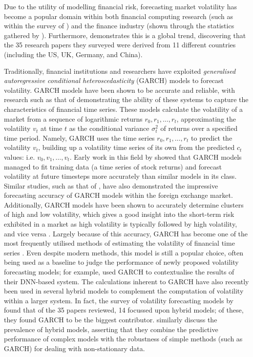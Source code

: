 \documentclass[a4paper, 11pt]{report}
\begin{document}
    Due to the utility of modelling financial risk, forecasting market volatility has become a popular domain within both financial computing research (such as within the survey of \citet{ozbayoglu-2020}) and the finance industry (shown through the statistics gathered by \citet{chartis-2019}). Furthermore, \citet{ge-2022} demonstrates this is a global trend, discovering that the 35 research papers they surveyed were derived from 11 different countries (including the US, UK, Germany, and China).

    Traditionally, financial institutions and researchers have exploited \emph{generalised autoregressive conditional heteroscedasticity} (GARCH) models to forecast volatility. GARCH models have been shown to be accurate and reliable, with research such as that of \citet{lahmiri-2017} demonstrating the ability of these systems to capture the characteristics of financial time series. These models calculate the volatility of a market from a sequence of logarithmic returns $r_0, r_1, \dots, r_t$, approximating the volatility $v_t$ at time $t$ as the conditional variance $\sigma_{t}^2$ of returns over a specified time period. Namely, GARCH uses the time series $r_0, r_1, \dots, r_t$ to predict the volatility $v_t$, building up a volatility time series of its own from the predicted $c_t$ values: i.e. $v_0, v_1, \dots, v_t$. Early work in this field by \citet{akgiray-1989} showed that GARCH models managed to fit training data (a time series of stock returns) and forecast volatility at future timesteps more accurately than similar models in its class. Similar studies, such as that of \citet{hansen-2005}, have also demonstrated the impressive forecasting accuracy of GARCH models within the foreign exchange market. Additionally, GARCH models have been shown to accurately determine clusters of high and low volatility, which gives a good insight into the short-term risk exhibited in a market as high volatility is typically followed by high volatility, and vice versa \citep{arum-2019}. Largely because of this accuracy, GARCH has become one of the most frequently utilised methods of estimating the volatility of financial time series \citep{cheng-2003}. Even despite modern methods, this model is still a popular choice, often being used as a baseline to judge the performance of newly proposed volatility forecasting models; for example, \citet{rodikov-2022} used GARCH to contextualise the results of their DNN-based system. The calculations inherent to GARCH have also recently been used in several hybrid models to complement the computation of volatility within a larger system. In fact, the survey of volatility forecasting models by \citet{ge-2022} found that of the 35 papers reviewed, 14 focussed upon hybrid models; of these, they found GARCH to be the biggest contributor. \citet{tino-2001} similarly discuss the prevalence of hybrid models, asserting that they combine the predictive performance of complex models with the robustness of simple methods (such as GARCH) for dealing with non-stationary data.
\end{document}
